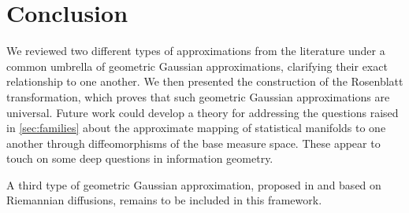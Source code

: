 \documentclass[runningheads,orivec]{llncs}
\begin{document}
\section{Conclusion}
    We reviewed two different types of approximations from the literature under a common umbrella of geometric Gaussian approximations, clarifying their exact relationship to one another. We then presented the construction of the Rosenblatt transformation, which proves that such geometric Gaussian approximations are universal. Future work could develop a theory for addressing the questions raised in \cref{sec:families} about the approximate mapping of statistical manifolds to one another through diffeomorphisms of the base measure space. These appear to touch on some deep questions in information geometry.
    
    A third type of geometric Gaussian approximation, proposed in \cite{roy_reparameterization_2024} and based on Riemannian diffusions, remains to be included in this framework.
\begin{credits}
\subsubsection{\ackname}
\end{credits}
%
%
%


%
\end{document}
